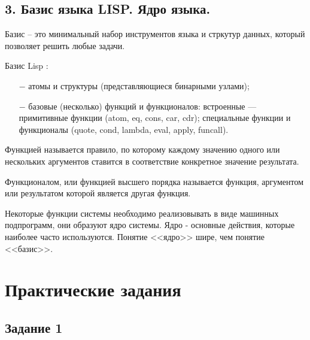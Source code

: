 \subsection*{3. Базис языка LISP. Ядро языка.}

Базис -- это минимальный набор инструментов языка и стркутур данных, который позволяет решить любые задачи.

Базис Lisp :

\begin{itemize}
	\item[$-$] атомы и структуры (представляющиеся бинарными узлами);
	\item[$-$] базовые (несколько) функций и функционалов: встроенные — примитивные 
	функции (atom, eq, cons, car, cdr); специальные функции и функционалы (quote, 
	cond, lambda, eval, apply, funcall).
\end{itemize}
	
Функцией называется правило, по которому каждому значению одного или нескольких  аргументов ставится в соответствие конкретное значение результата.

Функционалом, или функцией высшего порядка называется функция, аргументом или  результатом которой является другая функция.

Некоторые функции системы необходимо реализовывать в виде машинных подпрограмм, они образуют ядро системы. Ядро - основные действия, которые наиболее часто используются. Понятие <<ядро>> шире, чем понятие <<базис>>.

\section*{Практические задания}
\subsection*{Задание 1}

